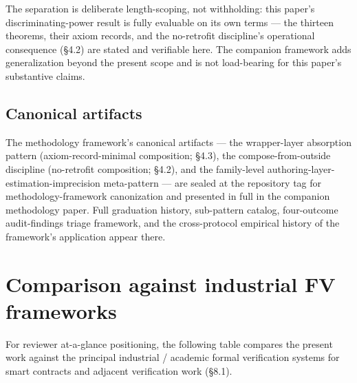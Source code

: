 The separation is deliberate length-scoping, not withholding: this
paper's discriminating-power result is fully evaluable on its own terms
--- the thirteen theorems, their axiom records, and the no-retrofit
discipline's operational consequence (§4.2) are stated and verifiable
here. The companion framework adds generalization beyond the present
scope and is not load-bearing for this paper's substantive claims.

\subsection{Canonical artifacts}\label{canonical-artifacts}

The methodology framework's canonical artifacts --- the wrapper-layer
absorption pattern (axiom-record-minimal composition; §4.3), the
compose-from-outside discipline (no-retrofit composition; §4.2), and the
family-level authoring-layer-estimation-imprecision meta-pattern --- are
sealed at the repository tag for methodology-framework canonization and
presented in full in the companion methodology paper. Full graduation
history, sub-pattern catalog, four-outcome audit-findings triage
framework, and the cross-protocol empirical history of the framework's
application appear there.

\section{Comparison against industrial FV
frameworks}\label{comparison-against-industrial-fv-frameworks}

For reviewer at-a-glance positioning, the following table compares the
present work against the principal industrial / academic formal
verification systems for smart contracts and adjacent verification work
(§8.1).

